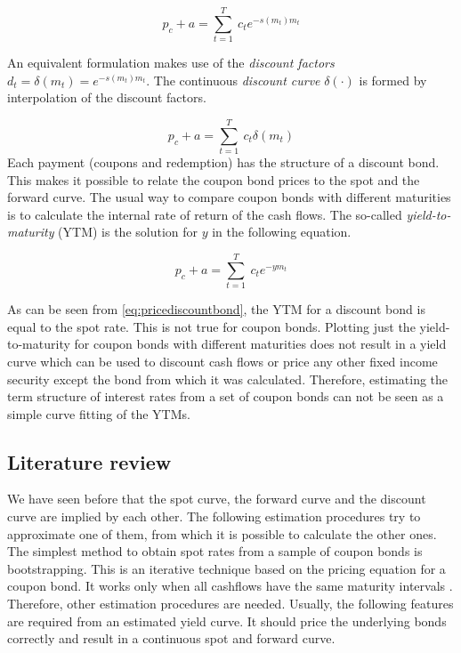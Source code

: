 \begin{equation}
  \label{bondpriceeq}
  p_c+a = \sum_{t=1}^T \ c_t e^{-s(m_t)m_t}
\end{equation}

An equivalent formulation makes use of the \emph{discount factors} $d_t=\delta(m_t)=e^{-s(m_t)m_t}$. The continuous \emph{discount curve} $\delta(\cdot)$ is formed by interpolation of the discount factors.


\begin{equation}
  \label{bondprceq2}
  p_c+a=\sum_{t=1}^T \ c_t \delta(m_t) 
\end{equation}
Each payment (coupons and redemption) has the structure of a discount bond. This makes it possible to relate the coupon bond prices to the spot and the forward curve. The usual way to compare coupon bonds with different maturities is to calculate the internal rate of return of the cash flows. The so-called \emph{yield-to-maturity} (YTM) is the solution for $y$ in the following equation.

\begin{equation}
   \label{eq:yield}
   p_c+a=\sum_{t=1}^T \ c_t e^{-ym_t}
 \end{equation}

As can be seen from \eqref{eq:pricediscountbond}, the YTM for a discount bond is equal to the spot rate. This is not true for coupon bonds. Plotting just the yield-to-maturity for coupon bonds with different maturities does not result in a yield curve which can be used to discount cash flows or price any other fixed income security except the bond from which it was calculated. Therefore, estimating the term structure of interest rates from a set of coupon bonds can not be seen as a simple curve fitting of the YTMs.

\subsection{Literature review}

We have seen before that the spot curve, the forward curve and the discount curve are implied by each other. The following estimation procedures try to approximate one of them, from which it is possible to calculate the other ones. The simplest method to obtain spot rates from a sample of coupon bonds is bootstrapping. This is an iterative technique based on the pricing equation for a coupon bond. It works only when all cashflows have the same maturity intervals \citep[see, e.g.][]{Hagan2006}. Therefore, other estimation procedures are needed. Usually, the following features are required from an estimated yield curve. It should price the underlying bonds correctly and result in a continuous spot and forward curve. 

